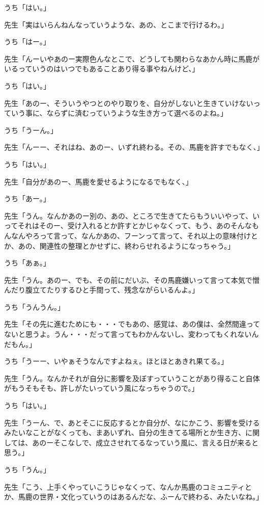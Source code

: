 \documentclass[b5j,twoside,twocolumn]{utarticle}
\begin{document}
\begin{description}
\item うち「はい。」
\item 先生「実はいらんねんなっていうような、あの、とこまで行けるわ。」
\item うち「はー。」
\item 先生「んーいやあのー実際色んなとこで、どうしても関わらなあかん時に馬鹿がいるっていうのはいつでもあることあり得る事やねんけど、」
\item うち「はい。」
\item 先生「あのー、そういうやつとのやり取りを、自分がしないと生きていけないっていう事に、ならずに済むっていうような生き方って選べるのよね。」
\item うち「うーん。」
\item 先生「んーー、それはね、あのー、いずれ終わる。その、馬鹿を許すでもなく、」
\item うち「はい。」
\item 先生「自分があのー、馬鹿を愛せるようになるでもなく、」
\item うち「あー。」
\item 先生「うん。なんかあのー別の、あの、ところで生きてたらもういいやって、いってそれはそのー、受け入れるとか許すとかじゃなくって、もう、あのそんなもんなんやろって言って、なんかあの、フーンって言って、それ以上の意味付けとか、あの、関連性の整理とかせずに、終わらせれるようになっちゃう。」
\item うち「あぁ。」
\item 先生「うん。あのー、でも、その前にだいぶ、その馬鹿嫌いって言って本気で憎んだり腹立てたりするひと手間って、残念ながらいるんよ。」
\item うち「うんうん。」
\item 先生「その先に進むためにも・・・でもあの、感覚は、あの僕は、全然間違ってないと思うよ。うん・・・だって言ってもわかんないし、変わってもくれないんだもん。」
\item うち「うーー、いやぁそうなんですよねぇ。ほとほとあきれ果てる。」
\item 先生「うん。なんかそれが自分に影響を及ぼすっていうことがあり得ること自体がもうそもそも、許しがたいっていう風になっちゃうので。」
\item うち「はい。」
\item 先生「うーん、で、あとそこに反応するとか自分が、なにかこう、影響を受けるみたいなことがなくっても、まあいずれ、自分の生きてる場所とか生き方、に関しては、あのーそこなしで、成立させれてるなっていう風に、言える日が来ると思う。」
\item うち「うん。」
\item 先生「こう、上手くやっていこうじゃなくって、なんか馬鹿のコミュニティとか、馬鹿の世界・文化っていうのはあるんだな、ふーんで終わる、みたいなね。」

\end{description}
\end{document}
